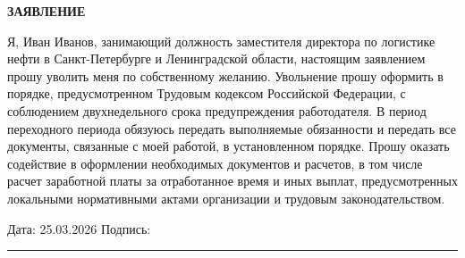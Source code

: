 \documentclass[12pt]{article}
\begin{document}
\begin{center}
\textbf{\LARGE ЗАЯВЛЕНИЕ}
\end{center}

\vspace{1cm}



Я, Иван Иванов, занимающий должность заместителя директора по логистике нефти в Санкт-Петербурге и Ленинградской области, настоящим заявлением прошу уволить меня по собственному желанию. Увольнение прошу оформить в порядке, предусмотренном Трудовым кодексом Российской Федерации, с соблюдением двухнедельного срока предупреждения работодателя. В период переходного периода обязуюсь передать выполняемые обязанности и передать все документы, связанные с моей работой, в установленном порядке. Прошу оказать содействие в оформлении необходимых документов и расчетов, в том числе расчет заработной платы за отработанное время и иных выплат, предусмотренных локальными нормативными актами организации и трудовым законодательством.

\vfill

\noindent
Дата: 25.03.2026 \hfill Подпись: \rule{5cm}{0.4pt}
\end{document}
